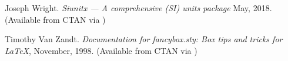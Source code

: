\begin{thebibliography}{GMS94A}
  Joseph Wright.
  \newblock \emph{Siunitx — A comprehensive (SI) units package}
  \newblock May, 2018.
  \newblock (Available from CTAN via )




\begin{comment}
\bibitem[Wis03]{WISHART03}
David Wishart.
\newblock \emph{The Printing of Mathematics}
\newblock in \emph{Type \& Typography: Highlights from \emph{Matrix}, the
       review for printers \& bibliophiles}.
\newblock Mark Batty Publisher, 2003.
\newblock ISBN 0--9715687--6--6.
\newblock (Originally published in \emph{Matrix 8}, 1988)

\bibitem[Wul53]{WULLING-FOOTNOTES}
  Emerson G. Wulling.
  \newblock \emph{A Comp's-Eye View of Footnotes}.
  \newblock Sumac Press, 1953.

\bibitem[Zac69]{ZACHRISSOM69}
  B.~Zachrissom.
  \newblock \emph{Studies in the Legibility of Printed Text}.
  \newblock Almqvist \& Wiksell, Stockholm, 1969.
\end{comment}

  Timothy Van Zandt.
  \newblock \emph{Documentation for fancybox.sty: Box tips and tricks for 
             LaTeX}, 
  \newblock November, 1998.
  \newblock (Available from CTAN via 
            )

\begin{comment}
\bibitem[Zap00]{ZAPF00}
  Hermann Zapf.
  \newblock \emph{The Fine Art of Letters}.
  \newblock The Grolier Club, 2000.
  \newblock ISBN 0--910672--35--0.
\end{comment}

\end{thebibliography}
